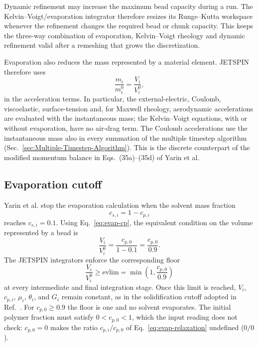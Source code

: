 Dynamic refinement may increase the maximum bead capacity during a run.
The Kelvin--Voigt/evaporation integrator therefore resizes its Runge--Kutta
workspace whenever the refinement changes the required bead or chunk
capacity.  This keeps the three-way combination of evaporation,
Kelvin--Voigt rheology and dynamic refinement valid after a remeshing that
grows the discretization.

Evaporation also reduces the mass represented by a material element.
JETSPIN therefore uses
\begin{equation}
 \frac{m_i}{m_i^0}=\frac{V_i}{V_i^0},
 \label{eq:evap-massratio}
\end{equation}
in the acceleration terms.  In particular, the external-electric,
Coulomb, viscoelastic, surface-tension and, for Maxwell rheology,
aerodynamic accelerations are evaluated with the instantaneous mass;
the Kelvin--Voigt equations, with or without evaporation, have no
air-drag term.  The Coulomb accelerations use the instantaneous mass
also in every summation of the multiple timestep algorithm
(Sec.~\ref{sec:Multiple-Timestep-Algorithm}).  This is the discrete
counterpart of the modified momentum balance in Eqs.~(35a)--(35d) of
Yarin et al.

\subsection{Evaporation cutoff}

Yarin et al. stop the evaporation calculation when the solvent mass
fraction
\begin{equation}
 c_{s,i}=1-c_{p,i}
\end{equation}
reaches $c_{s,i}=0.1$.  Using Eq.~\ref{eq:evap-cp}, the equivalent
condition on the volume represented by a bead is
\begin{equation}
 \frac{V_i}{V_i^0}=\frac{c_{p,0}}{1-0.1}=\frac{c_{p,0}}{0.9}.
 \label{eq:evap-cutoff}
\end{equation}
The JETSPIN integrators enforce the corresponding floor
\begin{equation}
 \frac{V_i}{V_i^0}\geq\mathrm{evlim}=\min\left(1,\frac{c_{p,0}}{0.9}\right)
 \label{eq:evap-evlim}
\end{equation}
at every intermediate and final integration stage.  Once this limit is reached,
$V_i$, $c_{p,i}$, $\mu_i$, $\theta_i$, and $G_i$ remain constant, as in
the solidification cutoff adopted in Ref.~\cite{yarin2001bending}.
For $c_{p,0}\geq0.9$ the floor is one and no solvent evaporates.  The
initial polymer fraction must satisfy $0<c_{p,0}<1$, which the input
reading does not check: $c_{p,0}=0$ makes the ratio $c_{p,i}/c_{p,0}$
of Eq.~\ref{eq:evap-relaxation} undefined ($0/0$).
